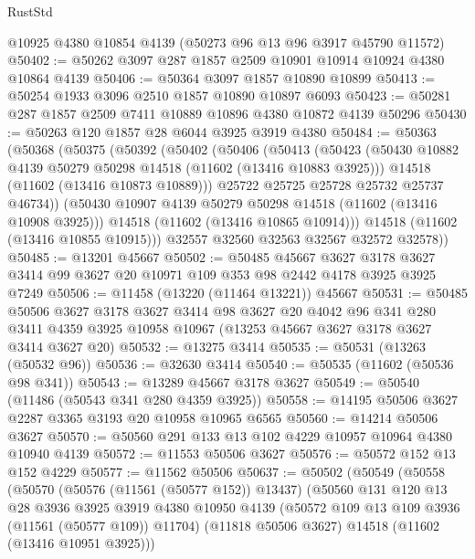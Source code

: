 \begin{lexlean}{RustStd}
\begin{coremodule}
    @10925
    @4380
    @10854
    @4139
    (@50273 @96 @13 @96 @3917 @45790 @11572)
@50402 := @50262 @3097 @287 @1857 @2509 @10901 @10914 @10924 @4380 @10864 @4139
@50406 := @50364 @3097 @1857 @10890 @10899
@50413 := @50254 @1933 @3096 @2510 @1857 @10890 @10897 @6093
@50423 := @50281 @287 @1857 @2509 @7411 @10889 @10896 @4380 @10872 @4139 @50296
@50430 := @50263 @120 @1857 @28 @6044 @3925 @3919 @4380
@50484 := @50363
    (@50368
      (@50375
        (@50392
          (@50402
            (@50406
              (@50413
                (@50423
                  (@50430 @10882 @4139 @50279 @50298 @14518 (@11602 (@13416 @10883 @3925)))
                  @14518
                  (@11602 (@13416 @10873 @10889)))
                @25722
                @25725
                @25728
                @25732
                @25737
                @46734))
            (@50430 @10907 @4139 @50279 @50298 @14518 (@11602 (@13416 @10908 @3925)))
            @14518
            (@11602 (@13416 @10865 @10914)))
          @14518
          (@11602 (@13416 @10855 @10915)))
        @32557
        @32560
        @32563
        @32567
        @32572
        @32578))
@50485 := @13201 @45667
@50502 := @50485
    @45667
    @3627
    @3178
    @3627
    @3414
    @99
    @3627
    @20
    @10971
    @109
    @353
    @98
    @2442
    @4178
    @3925
    @3925
    @7249
@50506 := @11458 (@13220 (@11464 @13221)) @45667
@50531 := @50485
    @50506
    @3627
    @3178
    @3627
    @3414
    @98
    @3627
    @20
    @4042
    @96
    @341
    @280
    @3411
    @4359
    @3925
    @10958
    @10967
    (@13253 @45667 @3627 @3178 @3627 @3414 @3627 @20)
@50532 := @13275 @3414
@50535 := @50531 (@13263 (@50532 @96))
@50536 := @32630 @3414
@50540 := @50535 (@11602 (@50536 @98 @341))
@50543 := @13289 @45667 @3178 @3627
@50549 := @50540 (@11486 (@50543 @341 @280 @4359 @3925))
@50558 := @14195 @50506 @3627 @2287 @3365 @3193 @20 @10958 @10965 @6565
@50560 := @14214 @50506 @3627
@50570 := @50560 @291 @133 @13 @102 @4229 @10957 @10964 @4380 @10940 @4139
@50572 := @11553 @50506 @3627
@50576 := @50572 @152 @13 @152 @4229
@50577 := @11562 @50506
@50637 := @50502
    (@50549
      (@50558
        (@50570
          (@50576 (@11561 (@50577 @152)) @13437)
          (@50560
            @131
            @120
            @13
            @28
            @3936
            @3925
            @3919
            @4380
            @10950
            @4139
            (@50572 @109 @13 @109 @3936 (@11561 (@50577 @109)) @11704)
            (@11818 @50506 @3627)
            @14518
            (@11602 (@13416 @10951 @3925)))

\end{coremodule}
\end{lexlean}
